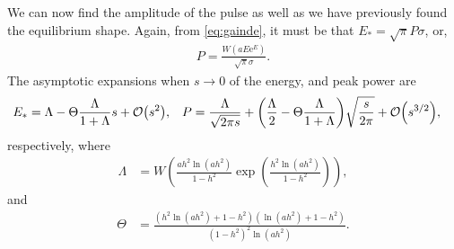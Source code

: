 We can now find the amplitude of the pulse as well as we have previously found the equilibrium shape. Again, from \eqref{eq:gainde}, it must be that $E_* = \sqrt{\pi} P \sigma$, or,
\begin{align}
P = \frac{W(a E \textrm{e}^E)}{\sqrt{\pi} \sigma}.
\end{align}
The asymptotic expansions when $s \rightarrow 0$ of the energy, and peak power are
\begin{align*}
E_* &= \Lambda - \Theta \frac{\Lambda}{1 + \Lambda} s + \bigO{s^2}, & P &= \frac{\Lambda}{\sqrt{2 \pi s}} + \left( \frac{\Lambda}{2} -  \Theta \frac{\Lambda}{1 + \Lambda} \right) \sqrt{\frac{s}{2 \pi}} +  \bigO{s^{3/2}},
\end{align*}
respectively, where
\begin{align*}
\Lambda &= W\left( \frac{a h^2 \ln(a h^2)}{1 - h^2} \exp \left( \frac{h^2 \ln(a h^2)}{1 - h^2} \right) \right),
\end{align*}
and
\begin{align*}
\Theta &= \frac{\left( h^2 \ln(a h^2) + 1 - h^2 \right) \left( \ln(a h^2) + 1 - h^2 \right)}{\left( 1 - h^2 \right)^2 \ln(a h^2)}.
\end{align*}



